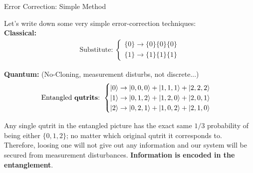 \documentclass[9pt, handout, aspectratio=169]{beamer}	%
\begin{document}

	\begin{frame}{Error Correction: Simple Method}

		Let's write down some very simple error-correction techniques: \\

		\vspace{10pt}
		\textbf{Classical:} \\
		\vspace{-10pt}
		\begin{align*}
		\text{Substitute:  }
		\begin{cases}
			\lbrace 0 \rbrace \rightarrow \lbrace 0 \rbrace \lbrace 0 \rbrace \lbrace 0 \rbrace \\
			\lbrace 1 \rbrace \rightarrow \lbrace 1 \rbrace \lbrace 1 \rbrace \lbrace 1 \rbrace
		\end{cases}
		\end{align*}

		\pause

		\textbf{Quantum:} (No-Cloning, measurement disturbs, not discrete...) \\
		\vspace{-4pt}
		\begin{align*}
		\text{Entangled \textbf{qutrits}:  }
		\begin{cases}
			\ket{0} \rightarrow \ket{0,0,0} + \ket{1,1,1} + \ket{2,2,2} \\
			\ket{1} \rightarrow \ket{0,1,2} + \ket{1,2,0} + \ket{2,0,1} \\
			\ket{2} \rightarrow \ket{0,2,1} + \ket{1,0,2} + \ket{2,1,0}
		\end{cases}
		\end{align*}

		\vspace{-0pt}
		Any single qutrit in the entangled picture has the exact same $1/3$ probability of being either $\lbrace 0,1,2 \rbrace$; no matter which original qutrit it corresponds to. Therefore, loosing one will not give out any information and our system will be secured from measurement disturbances. \textbf{Information is encoded in the entanglement}.

	\end{frame}



\end{document}
